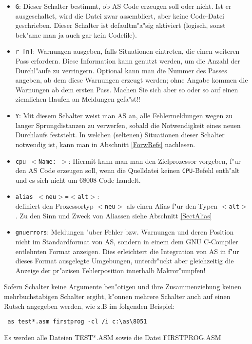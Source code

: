 \documentclass[12pt,a4paper,twoside]{report}
\newcommand{\tty}[1]{{\tt #1}}
\begin{document}
\begin{itemize}
\item{\tty{G}: Dieser Schalter bestimmt, ob AS Code erzeugen soll oder nicht.
      Ist er ausgeschaltet, wird die Datei zwar assembliert,
      aber keine Code-Datei geschrieben. Dieser Schalter ist defaultm"a"sig aktiviert
      (logisch, sonst bek"ame man ja auch gar kein Codefile).}
\item{\tty{r [n]}: Warnungen ausgeben, falls Situationen eintreten, die
      einen weiteren Pass erfordern.  Diese Information kann genutzt
      werden, um die Anzahl der Durchl"aufe zu verringern.  Optional kann
      man die Nummer des Passes angeben, ab dem diese Warnungen erzeugt
      werden; ohne Angabe kommen die Warnungen ab dem ersten Pass.  Machen
      Sie sich aber so oder so auf einen ziemlichen Haufen an Meldungen
      gefa"st!!}
\item{\tty{Y}: Mit diesem Schalter weist man AS an, alle Fehlermeldungen
      wegen zu langer Sprungdistanzen zu verwerfen, sobald die Notwendigkeit
      eines neuen Durchlaufs feststeht.  In welchen (seltenen) Situationen
      dieser Schalter notwendig ist, kann man in Abschnitt \ref{ForwRefs}
      nachlesen.}
\item{\tty{cpu $<$Name:  $>$}: Hiermit kann man man den Zielprozessor
      vorgeben, f"ur den AS Code erzeugen soll, wenn die Quelldatei keinen
      {\tt CPU}-Befehl enth"alt und es sich nicht um 68008-Code handelt.}
\item{\tty{alias $<$neu$>$=$<$alt$>$}:\\
      definiert den Prozessortyp \tty{$<$neu$>$} als einen Alias f"ur den
      Typen \tty{$<$alt$>$}.  Zu den Sinn und Zweck von Aliassen siehe
      Abschnitt \ref{SectAlias}}
\item{{\tt gnuerrors}: Meldungen "uber Fehler bzw. Warnungen und deren
      Position nicht im Standardformat von AS, sondern in einem dem GNU
      C-Compiler entlehnten Format anzeigen.  Dies erleichtert die
      Integration von AS in f"ur dieses Format ausgelegte Umgebungen,
      unterdr"uckt aber gleichzeitig die Anzeige der pr"azisen
      Fehlerposition innerhalb Makror"umpfen!}
\end{itemize}
Sofern Schalter keine Argumente ben"otigen und ihre Zusammenziehung
keinen mehrbuchstabigen Schalter ergibt, k"onnen mehrere Schalter
auch auf einen Rutsch angegeben werden, wie z.B im folgenden Beispiel:
\begin{verbatim}
 as test*.asm firstprog -cl /i c:\as\8051
\end{verbatim}
Es werden alle Dateien TEST*.ASM sowie die Datei FIRSTPROG.ASM
\end{document}
